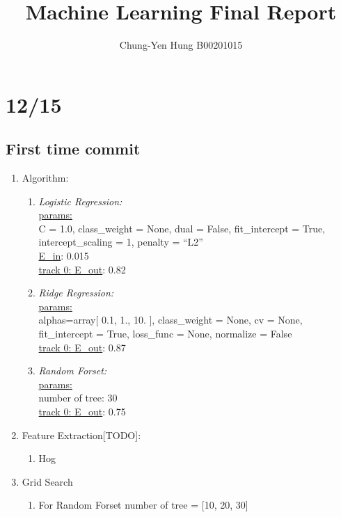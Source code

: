 \documentclass[12pt]{article}
\theoremstyle{definition}
\theoremstyle{remark}
\begin{document}

\title{Machine Learning Final Report}
\author{Chung-Yen Hung B00201015}
\maketitle


\section{12/15}
\subsection{First time commit}
\begin{enumerate}
    \item Algorithm:
      \begin{enumerate}
        \item {\em Logistic Regression:\/}\\
           \underline{params:} \\
            C = 1.0, class\_weight = None, dual = False, fit\_intercept = True, intercept\_scaling = 1, penalty = ``L2''\\
            \underline{E\_in}: 0.015 \\
            \underline{track 0: E\_out}: 0.82
          \item {\em Ridge Regression:\/} \\
            \underline{params:} \\
            alphas=array[  0.1,   1.,  10. ], class\_weight = None, cv = None, fit\_intercept = True, loss\_func = None, normalize = False \\
            \underline{track 0: E\_out}: 0.87 \\
          \item {\em Random Forset:\/} \\
            \underline{params:} \\
            number of tree: 30 \\
            \underline{track 0: E\_out}: 0.75
      \end{enumerate}
    \item Feature Extraction[TODO]:
      \begin{enumerate}
          \item Hog
      \end{enumerate}

    \item Grid Search
      \begin{enumerate}
        \item For Random Forset number of tree = [10, 20, 30]
      \end{enumerate}
\end{enumerate}
\end{document}
